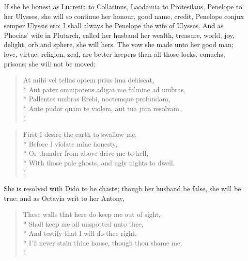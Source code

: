 If she be honest as Lucretia to Collatinus, Laodamia to Protesilaus,
Penelope to her Ulysses, she will so continue her honour, good name,
credit, Penelope conjux semper Ulyssis ero; I shall always be Penelope
the wife of Ulysses. And as Phocias' wife in Plutarch, called her
husband her wealth, treasure, world, joy, delight, orb and sphere, she
will hers. The vow she made unto her good man; love, virtue, religion,
zeal, are better keepers than all those locks, eunuchs, prisons; she
will not be moved:
%
\begin{latin}%
\begin{verse}%
At mihi vel tellus optem prius ima dehiscat,\\*
Aut pater omnipotens adigat me fulmine ad umbras,\\*
Pallentes umbras Erebi, noctemque profundam,\\*
Ante pudor quam te violem, aut tua jura resolvam.\\!
\end{verse}%
\end{latin}%
\translationrule%
\begin{verse}%
First I desire the earth to swallow me.\\*
Before I violate mine honesty,\\*
Or thunder from above drive me to hell,\\*
With those pale ghosts, and ugly nights to dwell.\\!
\end{verse}%
%

She is resolved with Dido to be chaste; though her husband be false,
she will be true: and as Octavia writ to her Antony,
%
\begin{verse}%
These walls that here do keep me out of sight,\\*
Shall keep me all unspotted unto thee,\\*
And testify that I will do thee right,\\*
I'll never stain thine house, though thou shame me.\\!
\end{verse}%

